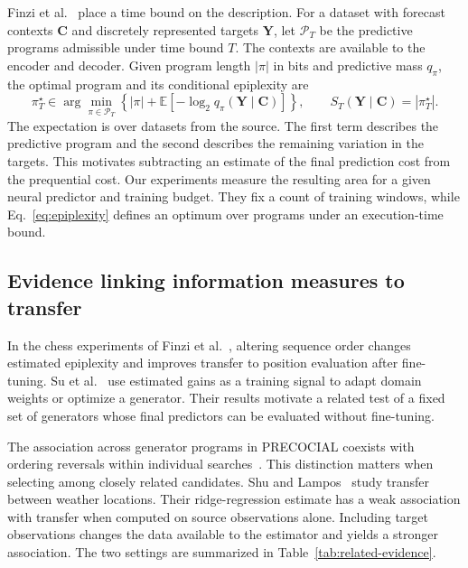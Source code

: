 \documentclass[10pt,a4paper]{article}
\theoremstyle{definition}
\begin{document}
Finzi et al.~\cite{finzi2026} place a time bound on the description. For
a dataset with forecast contexts $\mathbf C$ and discretely represented
targets $\mathbf Y$, let $\mathcal P_T$ be the predictive programs admissible
under time bound $T$. The contexts are available to the encoder and decoder.
Given program length $|\pi|$ in bits and predictive mass $q_\pi$, the optimal
program and its conditional epiplexity are
\begin{equation}
 \pi_T^\star\in\arg\min_{\pi\in\mathcal P_T}
 \left\{|\pi|+\mathbb E[-\log_2 q_\pi(\mathbf Y\mid\mathbf C)]\right\},
 \qquad S_T(\mathbf Y\mid\mathbf C)=|\pi_T^\star|.
 \label{eq:epiplexity}
\end{equation}
The expectation is over datasets from the source. The first term describes
the predictive program and the second describes the remaining variation in
the targets. This motivates subtracting an estimate of the final prediction
cost from the prequential cost. Our experiments measure the resulting area
for a given neural predictor and training budget. They fix a count of training
windows, while Eq.~\eqref{eq:epiplexity} defines an optimum over programs under
an execution-time bound.

\subsection{Evidence linking information measures to transfer}
In the chess experiments of Finzi et al.~\cite{finzi2026}, altering sequence
order changes estimated epiplexity and improves transfer to position
evaluation after fine-tuning. Su et al.~\cite{su2026} use estimated gains
as a training signal to adapt domain weights or optimize a generator.
Their results motivate a related test of a fixed set of generators whose
final predictors can be evaluated without fine-tuning.

The association across generator programs in PRECOCIAL coexists with
ordering reversals within individual searches~\cite{gu2026precocial}.
This distinction matters when selecting among closely related candidates.
Shu and Lampos~\cite{shu2026maps} study transfer between weather locations.
Their ridge-regression estimate has a weak association with transfer when
computed on source observations alone. Including target observations changes
the data available to the estimator and yields a stronger association.
The two settings are summarized in Table~\ref{tab:related-evidence}.
\end{document}
